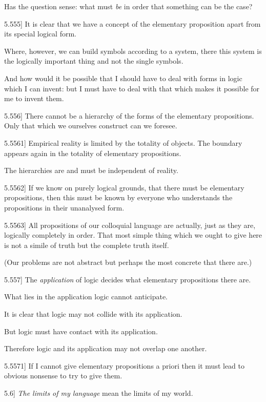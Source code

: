 \documentclass[12pt,oneside]{book}[2007/10/19]
\newcommand{\PropositionE}[2]{%
  \item[\phantomsection\label{PropE:#1}\PropGRef{#1}] #2%
}
\newcommand{\PropGRef}[1]{\hyperref[PropG:#1]{#1}}
\begin{document}
\begin{propositions}
{Has the question sense: what must \emph{be} in order
that something can be the case?}


\PropositionE{5.555}
{It is clear that we have a concept of the
elementary proposition apart from its special
logical form.

Where, however, we can build symbols
according to a system, there this system is the
logically important thing and not the single
symbols.

And how would it be possible that I should
have to deal with forms in logic which I can
invent: but I must have to deal with that which
makes it possible for me to invent them.}


\PropositionE{5.556}
{There cannot be a hierarchy of the forms of the
elementary propositions. Only that which we
ourselves construct can we foresee.}


\PropositionE{5.5561}
{Empirical reality is limited by the totality of
objects. The boundary appears again in the
totality of elementary propositions.

The hierarchies are and must be independent
of reality.}


\PropositionE{5.5562}
{If we know on purely logical grounds, that
there must be elementary propositions, then this
must be known by everyone who understands the
propositions in their unanalysed form.}


\PropositionE{5.5563}
{All propositions of our colloquial language are
actually, just as they are, logically completely in
order. That most simple thing which we ought to
give here is not a simile of truth but the complete
truth itself.

(Our problems are not abstract but perhaps the
most concrete that there are.)}


\PropositionE{5.557}
{The \emph{application} of logic decides what elementary
propositions there are.

What lies in the application logic cannot
anticipate.

It is clear that logic may not collide with its
application.

But logic must have contact with its application.

Therefore logic and its application may not
overlap one another.}


\PropositionE{5.5571}
{If I cannot give elementary propositions a
priori then it must lead to obvious nonsense to
try to give them.}


\PropositionE{5.6}
{\emph{The limits of my language} mean the limits of my
world.}



\end{propositions}
\end{document}
